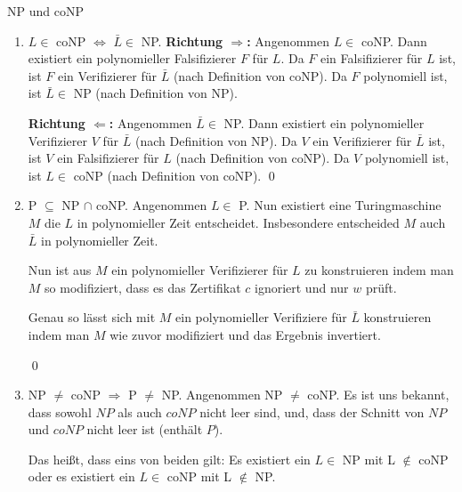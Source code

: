 \documentclass[answers]{submit}
\begin{document}
\begin{exercise}[12]{NP und coNP}
{\begin{enumerate}
            $F$ ist damit ein Falsifizierer für \textsc{NonIso}, da, wenn $\langle G,H\rangle\in \textsc{NonIso}$
            sind $G$ und $H$ nicht isomorph und es existiert kein $c$ so dass $c$ ein Graph-Isomorphismus zwischen $G$ und $H$ ist.

            Ist hingegen $\langle G,H\rangle\notin \textsc{NonIso}$, so ist $G$ und $H$ isomorph und es existiert ein $c$ so dass $c$ ein Graph-Isomorphismus zwischen $G$ und $H$ ist.
            \qed
      \item $L\in$ coNP $\Leftrightarrow$ $\bar L\in$ NP.
            \textbf{Richtung $\Rightarrow$:} Angenommen $L\in$ coNP.
            Dann existiert ein polynomieller Falsifizierer $F$ für $L$.
            Da $F$ ein Falsifizierer für $L$ ist, ist $F$ ein Verifizierer für $\bar L$ (nach Definition von coNP).
            Da $F$ polynomiell ist, ist $\bar L\in$ NP (nach Definition von NP).

            \textbf{Richtung $\Leftarrow$:} Angenommen $\bar L\in$ NP.
            Dann existiert ein polynomieller Verifizierer $V$ für $\bar L$ (nach Definition von NP).
            Da $V$ ein Verifizierer für $\bar L$ ist, ist $V$ ein Falsifizierer für $L$ (nach Definition von coNP).
            Da $V$ polynomiell ist, ist $L\in$ coNP (nach Definition von coNP).
            \qed
      \item P $\subseteq$ NP $\cap$ coNP.
            Angenommen $L\in$ P. Nun existiert eine Turingmaschine $M$ die $L$ in polynomieller Zeit entscheidet.
            Insbesondere entscheided $M$ auch $\bar L$ in polynomieller Zeit.

            Nun ist aus $M$ ein polynomieller Verifizierer für $L$ zu konstruieren indem man $M$ so modifiziert, dass es das Zertifikat $c$ ignoriert und nur $w$ prüft.

            Genau so lässt sich mit $M$ ein polynomieller Verifiziere für $\bar L$ konstruieren indem man $M$ wie zuvor modifiziert und das Ergebnis invertiert.

            \qed
      \item NP $\neq$ coNP $\Rightarrow$ P $\neq$ NP.
            Angenommen NP $\neq$ coNP. Es ist uns bekannt, dass sowohl $NP$ als auch $coNP$ nicht leer sind, und, dass der Schnitt von $NP$ und $coNP$ nicht leer ist (enthält $P$).

            Das heißt, dass eins von beiden gilt: Es existiert ein $L\in$ NP mit L $\notin$ coNP oder es existiert ein $L\in$ coNP mit L $\notin$ NP.


\end{enumerate}}
\end{exercise}
\end{document}
